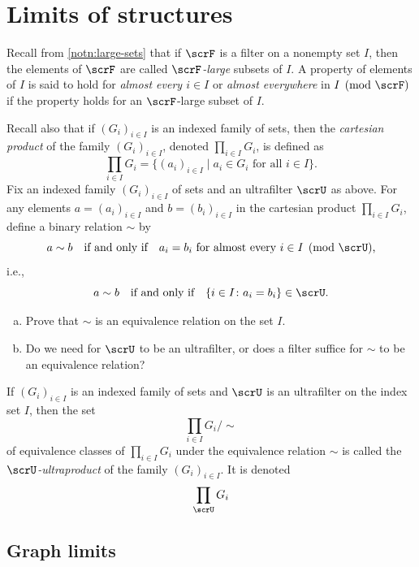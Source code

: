 \chapter{Limits of structures}

Recall from \ref{notn:large-sets} that if $\scrF$ is a filter on a nonempty set $I$, then the elements of $\scrF$ are called \emph{$\scrF$-large} subsets of $I$.
A property of elements of $I$ is said to hold for \emph{almost every $i\in I$} or \emph{almost everywhere} in $I \pmod{\scrF}$ if the property holds for an $\scrF$-large subset of $I$.

Recall also that if $(G_i)_{i\in I}$ is an indexed family of sets, then the \emph{cartesian product} of the family $(G_i)_{i\in I}$, denoted $\prod_{i\in I}G_i$, is defined as
\[
  \prod_{i\in I} G_i = \{ (a_i)_{i\in I} \mid \text{$a_i\in G_i$ for all $i \in I$}\}.
\]
Fix an indexed family $(G_i)_{i\in I}$ of sets and an ultrafilter $\scrU$ as above.
For any elements $a= (a_i)_{i\in I}$ and $b= (b_i)_{i\in I}$ in the cartesian product $\prod_{i\in I} G_i$, define a binary relation $\sim$ by
\[
  a\sim b
  \quad\text{if and only if}\quad
  \text{$a_i=b_i$ for almost every $i\in I \pmod{\scrU}$,}
\]
i.e.,
\[
  a\sim b
  \quad\text{if and only if}\quad
  \{i\in I \colon a_i=b_i \}\in\scrU.
\]

\begin{exercise}
  \begin{enumerate}[(a)]
  \item
    Prove that $\sim$ is an equivalence relation on the set $I$.
  \item
    Do we need for $\scrU$ to be an ultrafilter, or does a filter suffice for $\sim$ to be an equivalence relation?
  \end{enumerate}
\end{exercise}

\begin{definition}
  \label{def:ultraproduct-of-sets}
  If $(G_i)_{i\in I}$ is an indexed family of sets and $\scrU$ is an ultrafilter on the index set $I$, then the set
  \[
    \prod_{i\in I} G_i/\sim
  \]
  of equivalence classes of $\prod_{i\in I} G_i$ under the equivalence relation $\sim$ is called the  \emph{$\scrU$-ultraproduct}  of the family $(G_i)_{i\in I}$.
  It is denoted
  \[
    \prod_{\scrU} G_i
  \]
\end{definition}

\section{Graph limits}

